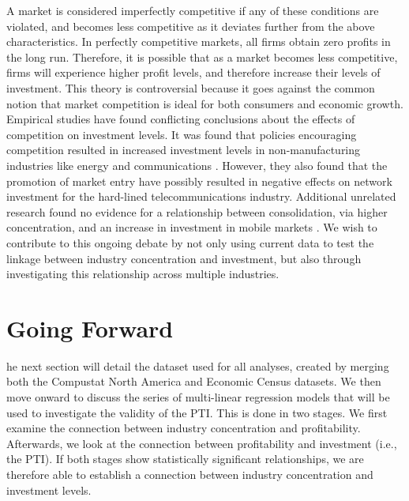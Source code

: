A market is considered imperfectly competitive if any of these conditions are violated, and becomes less competitive as it deviates further from the above characteristics. In perfectly competitive markets, all firms obtain zero profits in the long run. Therefore, it is possible that as a market becomes less competitive, firms will experience higher profit levels, and therefore increase their levels of investment. This theory is controversial because it goes against the common notion that market competition is ideal for both consumers and economic growth. Empirical studies have found conflicting conclusions about the effects of competition on investment levels. It was found that policies encouraging competition resulted in increased investment levels in non-manufacturing industries like energy and communications \cite[Alesina et al., 2005]{Alesina2005}. However, they also found that the promotion of market entry have possibly resulted in negative effects on network investment for the hard-lined telecommunications industry. Additional unrelated research found no evidence for a relationship between consolidation, via higher concentration, and an increase in investment in mobile markets \cite[Elixmann et al., 2015]{Elixmann2015}. We wish to contribute to this ongoing debate by not only using current data to test the linkage between industry concentration and investment, but also through investigating this relationship across multiple industries.

\section{Going Forward}
\label{sec:sec04}

he next section will detail the dataset used for all analyses, created by merging both the Compustat North America and Economic Census datasets. We then move onward to discuss the series of multi-linear regression models that will be used to investigate the validity of the PTI. This is done in two stages. We first examine the connection between industry concentration and profitability. Afterwards, we look at the connection between profitability and investment (i.e., the PTI). If both stages show statistically significant relationships, we are therefore able to establish a connection between industry concentration and investment levels.

